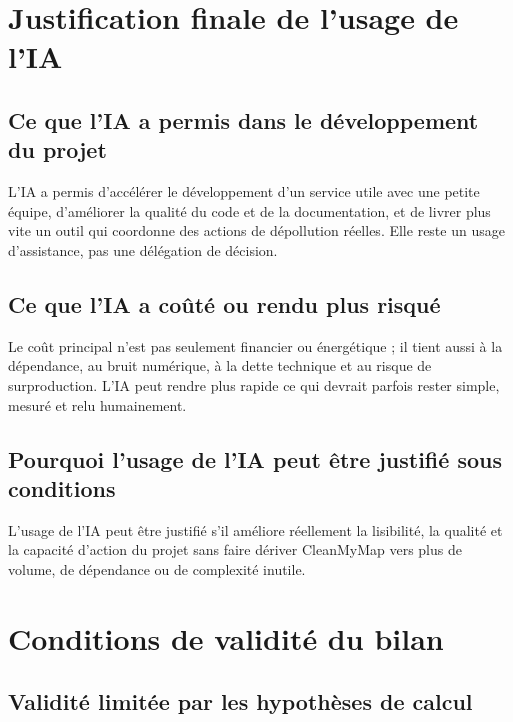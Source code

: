 \documentclass[
  10pt,
  a4paper,
  DIV=11,
  numbers=noendperiod,
  oneside]{scrreprt}
\begin{document}
\section{Justification finale de l'usage de
l'IA}\label{justification-finale-de-lusage-de-lia}

\subsection{Ce que l'IA a permis dans le développement du
projet}\label{ce-que-lia-a-permis-dans-le-duxe9veloppement-du-projet}

L'IA a permis d'accélérer le développement d'un service utile avec une
petite équipe, d'améliorer la qualité du code et de la documentation, et
de livrer plus vite un outil qui coordonne des actions de dépollution
réelles. Elle reste un usage d'assistance, pas une délégation de
décision.

\subsection{Ce que l'IA a coûté ou rendu plus
risqué}\label{ce-que-lia-a-couxfbtuxe9-ou-rendu-plus-risquuxe9}

Le coût principal n'est pas seulement financier ou énergétique ; il
tient aussi à la dépendance, au bruit numérique, à la dette technique et
au risque de surproduction. L'IA peut rendre plus rapide ce qui devrait
parfois rester simple, mesuré et relu humainement.

\subsection{Pourquoi l'usage de l'IA peut être justifié sous
conditions}\label{pourquoi-lusage-de-lia-peut-uxeatre-justifiuxe9-sous-conditions}

L'usage de l'IA peut être justifié s'il améliore réellement la
lisibilité, la qualité et la capacité d'action du projet sans faire
dériver CleanMyMap vers plus de volume, de dépendance ou de complexité
inutile.

\section{Conditions de validité du
bilan}\label{conditions-de-validituxe9-du-bilan}

\subsection{Validité limitée par les hypothèses de
calcul}\label{validituxe9-limituxe9e-par-les-hypothuxe8ses-de-calcul}
\end{document}
